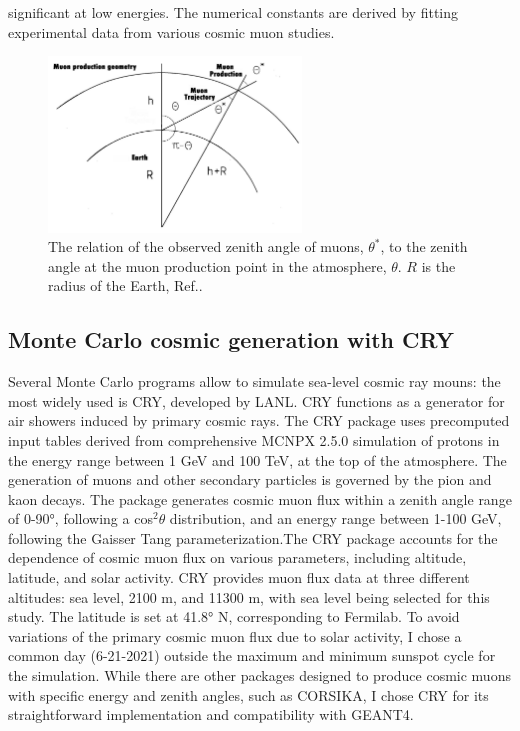 significant at low energies. The numerical constants are derived by fitting experimental data from various cosmic muon studies.
\begin{figure}[!h]
    \centering
    \includegraphics[width =0.6\textwidth]{figures/png/Screenshot_20240526_140716.png}
    \caption[The relation of $\theta^*$ to $\theta$.]{The relation of the observed zenith angle of muons, $\theta^*$, to 
    the zenith angle at the muon production point in the atmosphere, $\theta$. 
    $R$ is the radius of the Earth, Ref.\cite{guan2015parametrization}.}
    \label{fig:anglesinmuon}
\end{figure}

\subsection{Monte Carlo cosmic generation with CRY}
Several Monte Carlo programs allow to simulate sea-level 
cosmic ray mouns: the most widely used is CRY, developed 
by LANL. CRY functions as a generator for air showers 
induced by primary cosmic rays. The CRY package uses 
precomputed input tables derived from comprehensive 
MCNPX 2.5.0 simulation of protons in the energy range 
between 1 GeV and 100 TeV, at the top of the atmosphere.
The generation of muons and other secondary particles 
is governed by the pion and kaon decays. The package 
generates cosmic muon flux within a zenith angle range 
of 0-90°, following a cos$^2 \theta$ distribution, and an 
energy range between 1-100 GeV, following the Gaisser 
Tang parameterization.The CRY package accounts for the 
dependence of cosmic muon flux on various parameters, 
including altitude, latitude, and solar activity. CRY 
provides muon flux data at three different altitudes: 
sea level, 2100 m, and 11300 m, with sea level being 
selected for this study. The latitude is set at 41.8° N, 
corresponding to Fermilab. To avoid variations of the 
primary cosmic muon flux due to solar activity, I chose 
a common day (6-21-2021) outside the maximum and minimum 
sunspot cycle for the simulation. While there are other 
packages designed to produce cosmic muons with specific 
energy and zenith angles, such as CORSIKA, I chose CRY 
for its straightforward implementation and compatibility with GEANT4. 

